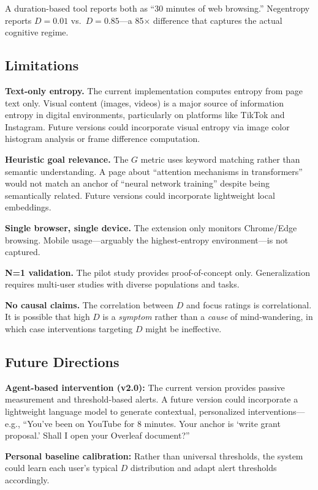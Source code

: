 \documentclass[10pt,letterpaper]{article}
\begin{document}
A duration-based tool reports both as ``30 minutes of web browsing.'' Negentropy reports $D = 0.01$ vs.\ $D = 0.85$---a 85$\times$ difference that captures the actual cognitive regime.

\subsection{Limitations}

\textbf{Text-only entropy.} The current implementation computes entropy from page text only. Visual content (images, videos) is a major source of information entropy in digital environments, particularly on platforms like TikTok and Instagram. Future versions could incorporate visual entropy via image color histogram analysis or frame difference computation.

\textbf{Heuristic goal relevance.} The $G$ metric uses keyword matching rather than semantic understanding. A page about ``attention mechanisms in transformers'' would not match an anchor of ``neural network training'' despite being semantically related. Future versions could incorporate lightweight local embeddings.

\textbf{Single browser, single device.} The extension only monitors Chrome/Edge browsing. Mobile usage---arguably the highest-entropy environment---is not captured.

\textbf{N=1 validation.} The pilot study provides proof-of-concept only. Generalization requires multi-user studies with diverse populations and tasks.

\textbf{No causal claims.} The correlation between $D$ and focus ratings is correlational. It is possible that high $D$ is a \emph{symptom} rather than a \emph{cause} of mind-wandering, in which case interventions targeting $D$ might be ineffective.

\subsection{Future Directions}

\textbf{Agent-based intervention (v2.0):} The current version provides passive measurement and threshold-based alerts. A future version could incorporate a lightweight language model to generate contextual, personalized interventions---e.g., ``You've been on YouTube for 8 minutes. Your anchor is `write grant proposal.' Shall I open your Overleaf document?''

\textbf{Personal baseline calibration:} Rather than universal thresholds, the system could learn each user's typical $D$ distribution and adapt alert thresholds accordingly.
\end{document}
